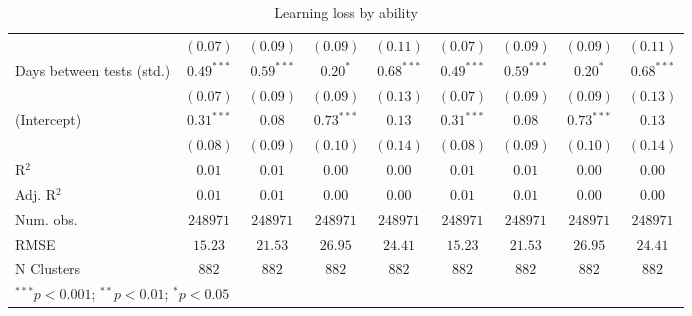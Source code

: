 \begin{table}
\begin{center}
\begin{tabular}{l c c c c c c c c}
                             & $(0.07)$      & $(0.09)$      & $(0.09)$      & $(0.11)$      & $(0.07)$      & $(0.09)$      & $(0.09)$      & $(0.11)$      \\
Days between tests (std.)    & $0.49^{***}$  & $0.59^{***}$  & $0.20^{*}$    & $0.68^{***}$  & $0.49^{***}$  & $0.59^{***}$  & $0.20^{*}$    & $0.68^{***}$  \\
                             & $(0.07)$      & $(0.09)$      & $(0.09)$      & $(0.13)$      & $(0.07)$      & $(0.09)$      & $(0.09)$      & $(0.13)$      \\
(Intercept)                  & $0.31^{***}$  & $0.08$        & $0.73^{***}$  & $0.13$        & $0.31^{***}$  & $0.08$        & $0.73^{***}$  & $0.13$        \\
                             & $(0.08)$      & $(0.09)$      & $(0.10)$      & $(0.14)$      & $(0.08)$      & $(0.09)$      & $(0.10)$      & $(0.14)$      \\
\hline
R$^2$                        & $0.01$        & $0.01$        & $0.00$        & $0.00$        & $0.01$        & $0.01$        & $0.00$        & $0.00$        \\
Adj. R$^2$                   & $0.01$        & $0.01$        & $0.00$        & $0.00$        & $0.01$        & $0.01$        & $0.00$        & $0.00$        \\
Num. obs.                    & $248971$      & $248971$      & $248971$      & $248971$      & $248971$      & $248971$      & $248971$      & $248971$      \\
RMSE                         & $15.23$       & $21.53$       & $26.95$       & $24.41$       & $15.23$       & $21.53$       & $26.95$       & $24.41$       \\
N Clusters                   & $882$         & $882$         & $882$         & $882$         & $882$         & $882$         & $882$         & $882$         \\
\hline
\multicolumn{9}{l}{\scriptsize{$^{***}p<0.001$; $^{**}p<0.01$; $^{*}p<0.05$}}
\end{tabular}
\caption{Learning loss by ability}
\label{table:ability_match}
\end{center}
\end{table}
